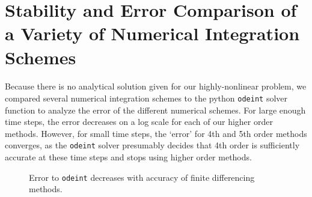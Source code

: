 \documentclass[12pt]{article}
\begin{document}
\section{Stability and Error Comparison of a Variety of Numerical Integration Schemes}
\paragraph{}Because there is no analytical solution given for our highly-nonlinear problem, we compared several numerical integration schemes to the python \texttt{odeint} solver function to analyze the error of the different numerical schemes.  For large enough time steps, the error decreases on a log scale for each of our higher order methods. However, for small time steps, the `error' for 4th and 5th order methods converges, as the \texttt{odeint} solver presumably decides that 4th order is sufficiently accurate at these time steps and stops using higher order methods.\\
\begin{figure}[H]
  \centering
  \caption{Error to \texttt{odeint} decreases with accuracy of finite differencing methods.}
\end{figure}
\end{document}
